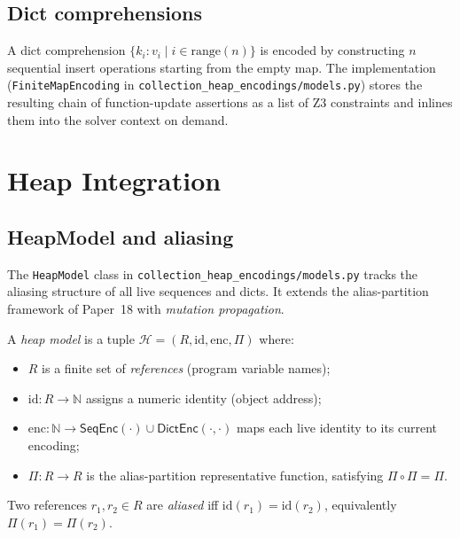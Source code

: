 \documentclass[11pt]{article}
\newcommand{\SeqEnc}[1]{\mathsf{SeqEnc}(#1)}
\newcommand{\HeapMod}{\mathcal{H}}
\newcommand{\DictEnc}[1]{\mathsf{DictEnc}(#1)}
\begin{document}
\subsection{Dict comprehensions}

A dict comprehension $\{k_i : v_i \mid i \in \text{range}(n)\}$ is encoded
by constructing $n$ sequential insert operations starting from the empty map.
The implementation (\texttt{FiniteMapEncoding} in
\texttt{collection\_heap\_encodings/models.py}) stores the resulting chain of
function-update assertions as a list of Z3 constraints and inlines them into
the solver context on demand.

\section{Heap Integration}\label{sec:heap}

\subsection{HeapModel and aliasing}

The \texttt{HeapModel} class in \texttt{collection\_heap\_encodings/models.py}
tracks the aliasing structure of all live sequences and dicts.  It extends
the alias-partition framework of Paper~18 with \emph{mutation propagation}.

\begin{definition}\label{def:heapmodel}
A \emph{heap model} is a tuple $\HeapMod = (R, \mathrm{id}, \mathrm{enc},
\Pi)$ where:
\begin{itemize}[nosep]
  \item $R$ is a finite set of \emph{references} (program variable names);
  \item $\mathrm{id} : R \to \mathbb{N}$ assigns a numeric identity (object address);
  \item $\mathrm{enc} : \mathbb{N} \to \SeqEnc{\cdot} \cup \DictEnc{\cdot,\cdot}$
        maps each live identity to its current encoding;
  \item $\Pi : R \to R$ is the alias-partition representative function,
        satisfying $\Pi \circ \Pi = \Pi$.
\end{itemize}
Two references $r_1, r_2 \in R$ are \emph{aliased} iff
$\mathrm{id}(r_1) = \mathrm{id}(r_2)$, equivalently $\Pi(r_1) = \Pi(r_2)$.
\end{definition}
\end{document}
